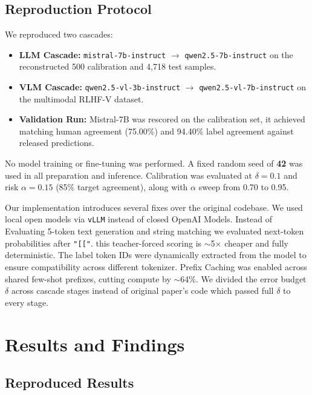 \documentclass[11pt,a4paper]{article}
\begin{document}
\subsection{Reproduction Protocol}

We reproduced two cascades:
\begin{itemize}[leftmargin=*]
    \item \textbf{LLM Cascade:} \texttt{mistral-7b-instruct} $\to$ \texttt{qwen2.5-7b-instruct} on the reconstructed 500 calibration and 4,718 test samples.
    \item \textbf{VLM Cascade:} \texttt{qwen2.5-vl-3b-instruct} $\to$ \texttt{qwen2.5-vl-7b-instruct} on the multimodal RLHF-V dataset.
    \item \textbf{Validation Run:} Mistral-7B was rescored on the calibration set, it achieved matching human agreement (75.00\%) and 94.40\% label agreement against released predictions.
\end{itemize}

No model training or fine-tuning was performed. A fixed random seed of \textbf{42} was used in all preparation and inference. Calibration was evaluated at $\delta = 0.1$ and risk $\alpha = 0.15$ (85\% target agreement), along with $\alpha$ sweep from 0.70 to 0.95.

Our implementation introduces several fixes over the original codebase. We used local open models via \texttt{vLLM} instead of closed OpenAI Models. Instead of Evaluating 5-token text generation and string matching we evaluated next-token probabilities after \texttt{"[["}. this teacher-forced scoring is $\sim$5$\times$ cheaper and fully deterministic. The label token IDs were dynamically extracted from the model to ensure compatibility across different tokenizer. Prefix Caching was enabled  across shared few-shot prefixes, cutting compute by $\sim$64\%. We divided the error budget $\delta$ across cascade stages instead of original paper's code which passed full $\delta$ to every stage.

\section{Results and Findings}

\subsection{Reproduced Results}
\end{document}
